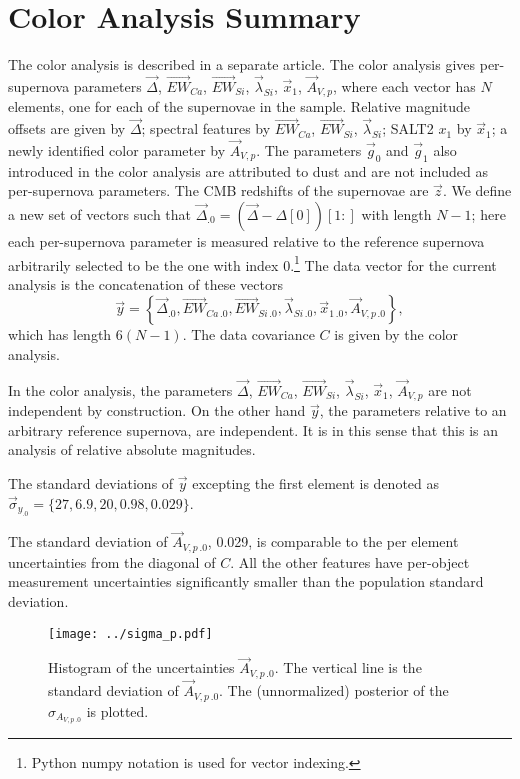 \documentclass{aastex61}   	%
\begin{document}
\section{Color Analysis Summary}
\label{color:sec}
The color analysis is described in a separate article.
The color analysis gives per-supernova parameters
$\vec{\Delta}$,  $\overrightarrow{EW}_{Ca}$,  $\overrightarrow{EW}_{Si}$,  $\vec{\lambda}_{Si}$,   $\vec{x}_1$,  $\vec{A}_{V,p}$,
where each vector has $N$ elements, one for each of the supernovae in the sample.  
Relative magnitude offsets are given by $\vec{\Delta}$; spectral features by $\overrightarrow{EW}_{Ca}$,  $\overrightarrow{EW}_{Si}$,  $\vec{\lambda}_{Si}$;
SALT2 $x_1$ by $\vec{x}_1$; a newly identified color parameter by $\vec{A}_{V,p}$.
The parameters $\vec{g}_0$ and $\vec{g}_1$ also introduced in the color analysis are attributed to dust
and are not included as per-supernova parameters.  The CMB redshifts of the supernovae are $\vec{z}$.  We define a new set of vectors such that
$\vec{\Delta}_{.0} = (\vec{\Delta} - \Delta[0])[1:]$ with length $N-1$; here each per-supernova parameter is measured relative to the
reference supernova arbitrarily selected to be the one with index 0.\footnote{Python numpy notation is used for vector indexing.}
The data vector for the current analysis is the concatenation of these vectors
\[
\vec{y} = \left\{\vec{\Delta}_{.0} , \overrightarrow{EW}_{Ca\,.0} ,  \overrightarrow{EW}_{Si\,.0},  \vec{\lambda}_{Si\,.0},   \vec{x}_{1\,.0}, \vec{A}_{V,p\,.0}\right\},
\]
which has length $6(N-1)$.  The data covariance $C$ is given by the color analysis.

In the color analysis, the parameters $\vec{\Delta}$,  $\overrightarrow{EW}_{Ca}$,  $\overrightarrow{EW}_{Si}$,  $\vec{\lambda}_{Si}$,   $\vec{x}_1$,  $\vec{A}_{V,p}$ are not independent by construction.  
On the other hand $\vec{y}$, the parameters relative to an arbitrary reference supernova, are independent.  It is in this sense that
this is an analysis of relative absolute magnitudes.

The standard deviations of $\vec{y}$ excepting the first element is denoted as $\vec{\sigma}_{y_{.0}}=\{27,  6.9,  20,   0.98,   0.029\}$.

The  standard deviation of $\vec{A}_{V,p\,.0}$, 0.029,  is comparable to the per element uncertainties from the diagonal of $C$.
All the other features have per-object measurement uncertainties significantly smaller than the population standard deviation.

\begin{figure}[htbp] %
   \centering
   \texttt{[image: ../sigma\_p.pdf]}
   \caption{
Histogram of the uncertainties $\vec{A}_{V,p\,.0}$.  The vertical line is the standard deviation of $\vec{A}_{V,p\,.0}$.
The (unnormalized) posterior of the $\sigma_{{A}_{V,p\,.0}}$ is plotted.
   \label{sigma_p:fig}}
\end{figure}
\end{document}
